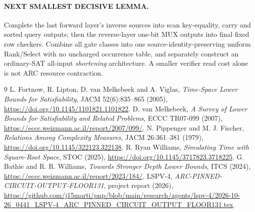 \documentclass[11pt]{article}
\begin{document}
\paragraph{NEXT SMALLEST DECISIVE LEMMA.}
Complete the last forward layer's inverse sources
into scan key-equality, carry and sorted query
outputs; then the reverse-layer one-bit MUX
outputs into final fixed row checkers. Combine
all gate classes into one source-identity-preserving
uniform Rank/Select with no uncharged occurrence
table, and separately construct an ordinary-SAT
all-input \emph{shortening} architecture.
A smaller verifier read cost alone is not ARC
resource contraction.

\begin{thebibliography}{9}
 L. Fortnow, R. Lipton, D. van Melkebeek
and A. Viglas, \emph{Time-Space Lower Bounds for
Satisfiability}, JACM 52(6):835--865 (2005),
\url{https://doi.org/10.1145/1101821.1101822}.
 D. van Melkebeek,
\emph{A Survey of Lower Bounds for Satisfiability
and Related Problems}, ECCC TR07-099 (2007),
\url{https://eccc.weizmann.ac.il/report/2007/099/}.
 N. Pippenger and M. J. Fischer,
\emph{Relations Among Complexity Measures}, JACM
26:361--381 (1979),
\url{https://doi.org/10.1145/322123.322138}.
 R. Ryan Williams,
\emph{Simulating Time with Square-Root Space},
STOC (2025),
\url{https://doi.org/10.1145/3717823.3718225}.
 G. Bathie and R. R. Williams,
\emph{Towards Stronger Depth Lower Bounds},
ITCS (2024),
\url{https://eccc.weizmann.ac.il/report/2023/184/}.
 LSPV-4,
\emph{ARC-PINNED-CIRCUIT-OUTPUT-FLOOR131},
project report (2026),
\url{https://github.com/j15marti/pnp/blob/main/research/agents/lspv-4/2026-10-26_0441_LSPV-4_ARC_PINNED_CIRCUIT_OUTPUT_FLOOR131.tex}.
\end{thebibliography}
\end{document}
